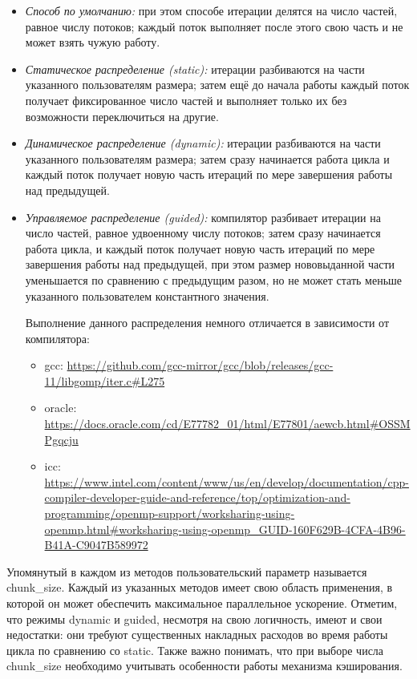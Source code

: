 \begin{itemize}
    \item\textit{Способ по умолчанию:} при этом способе итерации делятся на число частей, равное числу потоков; каждый поток выполняет после этого свою часть и не может взять чужую работу.
    \item\textit{Статическое распределение (static):} итерации разбиваются на части указанного пользователям размера; затем ещё до начала работы каждый поток получает фиксированное число частей и выполняет только их без возможности переключиться на другие.
    \item\textit{Динамическое распределение (dynamic):} итерации разбиваются на части указанного пользователям размера; затем сразу начинается работа цикла и каждый поток получает новую часть итераций по мере завершения работы над предыдущей.
    \item\textit{Управляемое распределение (guided):} компилятор разбивает итерации на число частей, равное удвоенному числу потоков; затем сразу начинается работа цикла, и каждый поток получает новую часть итераций по мере завершения работы над предыдущей, при этом размер нововыданной части уменьшается по сравнению с предыдущим разом, но не может стать меньше указанного пользователем константного значения.

Выполнение данного распределения немного отличается в зависимости от компилятора:

    \begin{itemize}
    \item gcc: \url{https://github.com/gcc-mirror/gcc/blob/releases/gcc-11/libgomp/iter.c#L275}
    \item oracle: \url{https://docs.oracle.com/cd/E77782_01/html/E77801/aewcb.html#OSSMPgqcju}
    \item icc: \url{https://www.intel.com/content/www/us/en/develop/documentation/cpp-compiler-developer-guide-and-reference/top/optimization-and-programming/openmp-support/worksharing-using-openmp.html#worksharing-using-openmp_GUID-160F629B-4CFA-4B96-B41A-C9047B589972}
    \end{itemize}
\end{itemize}

Упомянутый в каждом из методов пользовательский параметр называется chunk\_size. Каждый из указанных методов имеет свою область применения, в которой он может обеспечить максимальное параллельное ускорение. Отметим, что режимы dynamic и guided, несмотря на свою логичность, имеют и свои недостатки: они требуют существенных накладных расходов во время работы цикла по сравнению со static. Также важно понимать, что при выборе числа chunk\_size необходимо учитывать особенности работы механизма кэширования.

